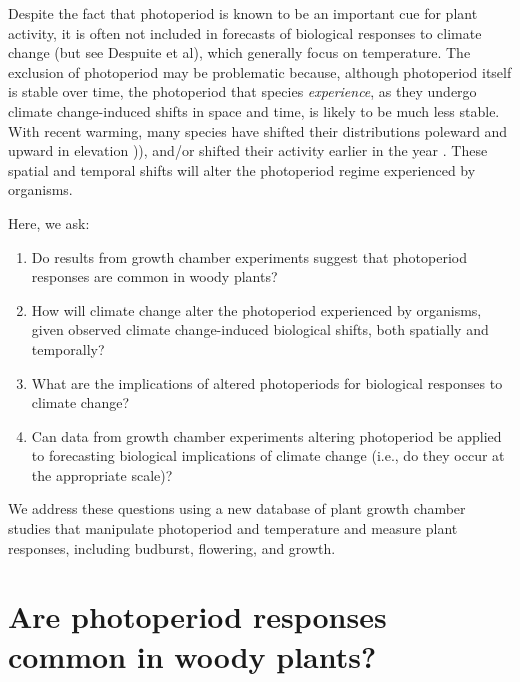\documentclass{article}
\begin{document}
\par Despite the fact that photoperiod is known to be an important cue for plant activity, it is often not included in forecasts of biological responses to climate change (but see Despuite et al), which generally focus on temperature.
The exclusion of photoperiod may be problematic because, although photoperiod itself is stable over time, the photoperiod that species \emph{experience}, as they undergo climate change-induced shifts in space and time, is likely to be much less stable. With recent warming, many species have shifted their distributions poleward and upward in elevation \citep[][i.e., range shifts]{parmesan2006, chen2011,harsch2009})), and/or shifted their activity earlier in the year \citep[][i.e., phenological shifts]{parmesan2006, wolkovich2012}. These spatial and temporal shifts will alter the photoperiod regime experienced by organisms. 
\par Here, we ask: 
\begin{enumerate}
\item Do results from growth chamber experiments suggest that photoperiod responses are common in woody plants?
\item How will climate change alter the photoperiod experienced by organisms, given observed climate change-induced biological shifts, both spatially and temporally?
\item What are the implications of altered photoperiods for biological responses to climate change?
\item Can data from growth chamber experiments altering photoperiod be applied to forecasting biological implications of climate change (i.e., do they occur at the appropriate scale)?

\end{enumerate}
\par We address these questions using a new database of plant growth chamber studies that manipulate photoperiod and temperature and measure plant responses, including budburst, flowering, and growth. 


\section*{Are photoperiod responses common in woody plants?}
\end{document}
